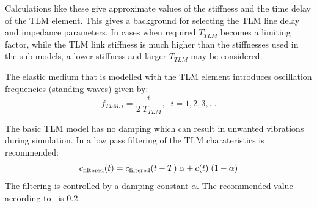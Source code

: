 Calculations like these give approximate values of the stiffness and the time delay of the 
TLM element. This gives a background for selecting the TLM line delay and impedance parameters.
In cases when required $T_{TLM}$ becomes a limiting factor, while
the TLM link stiffness is much higher than the stiffnesses used
in the sub-models, a lower stiffness and larger $T_{TLM}$ may be 
considered.

The elastic medium that is modelled with the TLM element introduces
oscillation frequencies (standing waves) given by:
\begin{equation}
\label{eqTspring}
f_{TLM, i} = \frac{i}{2\;T_{TLM}}, \;\; i = 1, 2, 3, ...
\end{equation}

The basic TLM model has no damping which can result in unwanted vibrations during simulation.
In \cite{KrusModMech-99} a low pass filtering of the TLM charateristics is recommended:
\begin{equation}
c_{\mbox{{\scriptsize {filtered}}}}(t) = c_{\mbox{{\scriptsize {filtered}}}}(t - T) \; \alpha + c(t) \; (1 - \alpha)
\end{equation}
The filtering is controlled by a damping constant $\alpha$. The
recommended value according to~ \cite{KrusModMech-99} is $0.2$.


